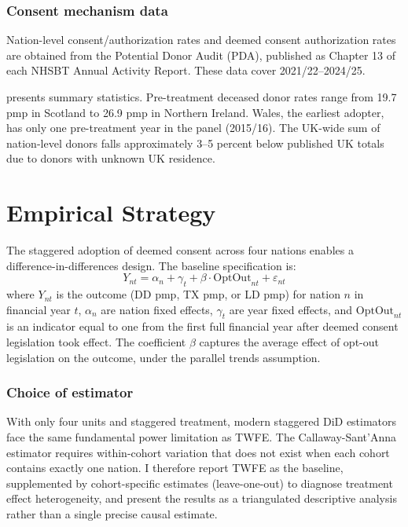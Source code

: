\documentclass[12pt]{article}
\begin{document}
\subsubsection*{Consent mechanism data} Nation-level consent/authorization rates and deemed consent authorization rates are obtained from the Potential Donor Audit (PDA), published as Chapter 13 of each NHSBT Annual Activity Report. These data cover 2021/22--2024/25.

 presents summary statistics. Pre-treatment deceased donor rates range from 19.7 pmp in Scotland to 26.9 pmp in Northern Ireland. Wales, the earliest adopter, has only one pre-treatment year in the panel (2015/16). The UK-wide sum of nation-level donors falls approximately 3--5 percent below published UK totals due to donors with unknown UK residence.



\section{Empirical Strategy}

The staggered adoption of deemed consent across four nations enables a difference-in-differences design. The baseline specification is:
\begin{equation}
Y_{nt} = \alpha_n + \gamma_t + \beta \cdot \text{OptOut}_{nt} + \varepsilon_{nt}
\label{eq:did}
\end{equation}
where $Y_{nt}$ is the outcome (DD pmp, TX pmp, or LD pmp) for nation $n$ in financial year $t$, $\alpha_n$ are nation fixed effects, $\gamma_t$ are year fixed effects, and $\text{OptOut}_{nt}$ is an indicator equal to one from the first full financial year after deemed consent legislation took effect. The coefficient $\beta$ captures the average effect of opt-out legislation on the outcome, under the parallel trends assumption.

\subsubsection*{Choice of estimator} With only four units and staggered treatment, modern staggered DiD estimators \citep{callaway2021difference} face the same fundamental power limitation as TWFE. The Callaway-Sant'Anna estimator requires within-cohort variation that does not exist when each cohort contains exactly one nation. I therefore report TWFE as the baseline, supplemented by cohort-specific estimates (leave-one-out) to diagnose treatment effect heterogeneity, and present the results as a triangulated descriptive analysis rather than a single precise causal estimate.
\end{document}

